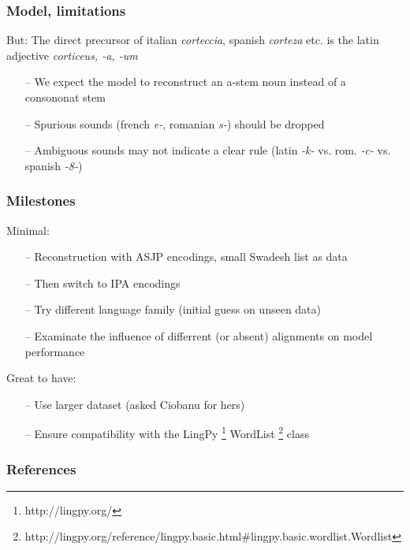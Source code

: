 \documentclass[11pt]{beamer}
\begin{document}
\begin{frame}
    \frametitle{Model, limitations}
    But: The direct precursor of italian \textit{corteccia}, spanish \textit{corteza} etc. is the latin adjective \textit{corticeus, -a, -um}
    \begin{itemize}
        \item[--] We expect the model to reconstruct an a-stem noun instead of a consononat stem 
        \item[--] Spurious sounds (french \textit{e-}, romanian \textit{s-}) should be dropped
        \item[--] Ambiguous sounds may not indicate a clear rule (latin \textit{-k-} vs. rom. \textit{-c-} vs. spanish \textit{-8-})  
    \end{itemize}
\end{frame}

\begin{frame}
    \frametitle{Milestones}
    Minimal:
    \begin{itemize}
        \item[--] Reconstruction with ASJP encodings, small Swadesh list as data 
        \item[--] Then switch to IPA encodings
        \item[--] Try different language family (initial guess on unseen data)
        \item[--] Examinate the influence of differrent (or absent) alignments on model performance  
    \end{itemize}    
    Great to have:
    \begin{itemize}
        \item[--] Use larger dataset (asked Ciobanu for hers)
        \item[--] Ensure compatibility with the LingPy \footnote{http://lingpy.org/} WordList 
        \footnote{http://lingpy.org/reference/lingpy.basic.html\#lingpy.basic.wordlist.Wordlist} class
    \end{itemize}
\end{frame}

\begin{frame}
    \frametitle{References}
    
\end{frame}
\end{document}
